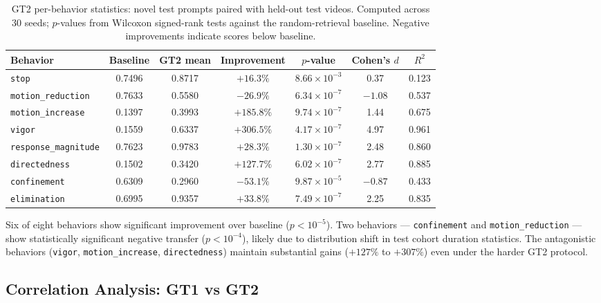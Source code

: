 \documentclass{article}
\begin{document}
\begin{table}[h]
\centering
\caption{GT2 per-behavior statistics: novel test prompts paired with held-out test videos. Computed across 30 seeds; $p$-values from Wilcoxon signed-rank tests against the random-retrieval baseline. Negative improvements indicate scores below baseline.}
\label{tab:gt2_detailed}
\small
\begin{tabular}{lcccccc}
\toprule
Behavior & Baseline & GT2 mean & Improvement & $p$-value & Cohen's $d$ & $R^2$ \\
\midrule
\texttt{stop}                & 0.7496 & 0.8717 & $+16.3\%$  & $8.66 \times 10^{-3}$ & 0.37 & 0.123 \\
\texttt{motion\_reduction}   & 0.7633 & 0.5580 & $-26.9\%$  & $6.34 \times 10^{-7}$ & $-1.08$ & 0.537 \\
\texttt{motion\_increase}    & 0.1397 & 0.3993 & $+185.8\%$ & $9.74 \times 10^{-7}$ & 1.44 & 0.675 \\
\texttt{vigor}               & 0.1559 & 0.6337 & $+306.5\%$ & $4.17 \times 10^{-7}$ & 4.97 & 0.961 \\
\texttt{response\_magnitude} & 0.7623 & 0.9783 & $+28.3\%$  & $1.30 \times 10^{-7}$ & 2.48 & 0.860 \\
\texttt{directedness}        & 0.1502 & 0.3420 & $+127.7\%$ & $6.02 \times 10^{-7}$ & 2.77 & 0.885 \\
\texttt{confinement}         & 0.6309 & 0.2960 & $-53.1\%$  & $9.87 \times 10^{-5}$ & $-0.87$ & 0.433 \\
\texttt{elimination}         & 0.6995 & 0.9357 & $+33.8\%$  & $7.49 \times 10^{-7}$ & 2.25 & 0.835 \\
\bottomrule
\end{tabular}
\end{table}

Six of eight behaviors show significant improvement over baseline ($p < 10^{-5}$). Two behaviors --- \texttt{confinement} and \texttt{motion\_reduction} --- show statistically significant negative transfer ($p < 10^{-4}$), likely due to distribution shift in test cohort duration statistics. The antagonistic behaviors (\texttt{vigor}, \texttt{motion\_increase}, \texttt{directedness}) maintain substantial gains ($+127\%$ to $+307\%$) even under the harder GT2 protocol.

\subsection{Correlation Analysis: GT1 vs GT2}
\end{document}
